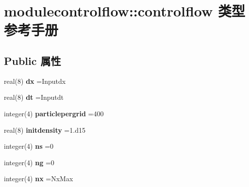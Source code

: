 \hypertarget{structmodulecontrolflow_1_1controlflow}{}\section{modulecontrolflow\+::controlflow 类型参考手册}
\label{structmodulecontrolflow_1_1controlflow}
\subsection*{Public 属性}
\begin{DoxyCompactItemize}
\item 
\mbox{\label{structmodulecontrolflow_1_1controlflow_a74109e24f56e284a228d9bba855c82a1}} 
real(8) {\bfseries dx} =Inputdx
\item 
\mbox{\label{structmodulecontrolflow_1_1controlflow_af190c80c402948b2cfb572f91dfed708}} 
real(8) {\bfseries dt} =Inputdt
\item 
\mbox{\label{structmodulecontrolflow_1_1controlflow_a94641d6fdac6c3310a448217977ee943}} 
integer(4) {\bfseries particlepergrid} =400
\item 
\mbox{\label{structmodulecontrolflow_1_1controlflow_a6e85e1e824b581917401ba632fb889af}} 
real(8) {\bfseries initdensity} =1.d15
\item 
\mbox{\label{structmodulecontrolflow_1_1controlflow_a602c90fbb62aeccfc9024f5e588aada5}} 
integer(4) {\bfseries ns} =0
\item 
\mbox{\label{structmodulecontrolflow_1_1controlflow_ac2f4059ad1146397e77764b530ce23a7}} 
integer(4) {\bfseries ng} =0
\item 
\mbox{\label{structmodulecontrolflow_1_1controlflow_aad8818266444ba46691ae2b64e3e06b6}} 
integer(4) {\bfseries nx} =Nx\+Max
\item 
\mbox{\label{structmodulecontrolflow_1_1controlflow_a748bea886c2be82ed55def6995fe02da}} 

\end{DoxyCompactItemize}
